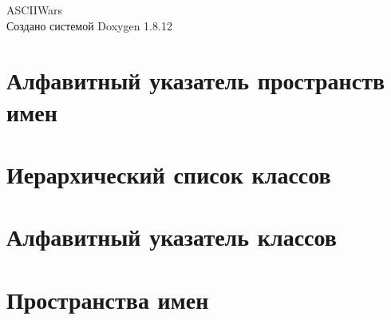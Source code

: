 \documentclass[twoside]{book}
\newcommand{\+}{\discretionary{\mbox{\scriptsize$\hookleftarrow$}}{}{}}
\newcommand{\clearemptydoublepage}{%
  \newpage{\pagestyle{empty}\cleardoublepage}%
}
\begin{document}
\hypersetup{pageanchor=false,
             bookmarksnumbered=true,
             pdfencoding=unicode
            }
\begin{titlepage}
\vspace*{7cm}
\begin{center}%
{\Large A\+S\+C\+I\+I\+Wars }\\
\vspace*{1cm}
{\large Создано системой Doxygen 1.8.12}\\
\end{center}
\end{titlepage}
\clearemptydoublepage
{}
\tableofcontents
\clearemptydoublepage
{}
\hypersetup{pageanchor=true}

\chapter{Алфавитный указатель пространств имен}

\chapter{Иерархический список классов}

\chapter{Алфавитный указатель классов}

\chapter{Пространства имен}



\end{document}
